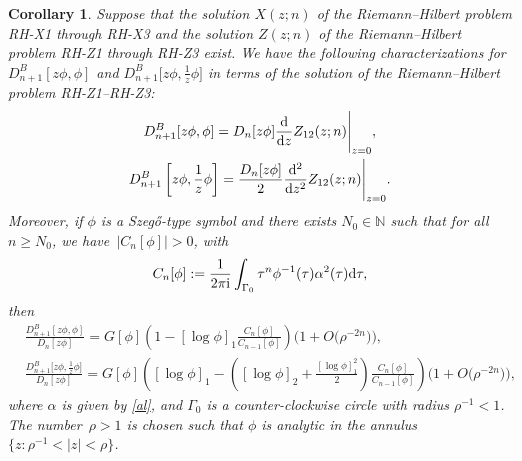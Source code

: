 \documentclass[pdftex]{sigma}
\numberwithin{equation}{section}
\newtheorem{Corollary}[Theorem]{Corollary}
\newcommand{\N}{{\mathbb N}}
\newcommand{\al}{\alpha}
\newcommand{\Ga}{\Gamma}
\newcommand{\ii}{{\rm i}}
\newcommand{\dd}{{\rm d}}
\begin{document}
		\begin{Corollary}\label{Cor zphi phi and phi/z}
			Suppose that the solution $X(z;n)$ of the Riemann--Hilbert problem {\rm RH-X1} through {\rm RH-X3} and the solution $Z(z;n)$ of the Riemann--Hilbert problem {\rm RH-Z1} through {\rm RH-Z3} exist. We have the following characterizations for $D^B_{n+1}[z\phi,\phi]$ and $D^B_{n+1}\big[z\phi,\frac{1}{z}\phi\big]$ in terms of the solution of the Riemann--Hilbert problem {\rm RH-Z1}--{\rm RH-Z3}:
			\begin{gather*}
				D^B_{n+1}[z\phi,\phi] = D_n[z\phi] \frac{\dd}{\dd z}Z_{12}(z;n) \Bigg|_{z=0}, \\
				D^B_{n+1}\left[z\phi,\frac{1}{z}\phi\right] = \frac{D_n[z\phi]}{2} \frac{\dd^2}{\dd z^2}Z_{12}(z;n) \Bigg|_{z=0}.
			\end{gather*}
			Moreover, if $\phi$ is a Szeg\H{o}-type symbol and there exists $N_0 \in \N$ such that for all $n \geq N_0$, we have~${|C_n[\phi]|>0}$, with
			\begin{equation}\label{Cnphi}
				C_n[\phi] := \frac{1}{2 \pi \ii} \int_{\Ga_0} \tau^n \phi^{-1}(\tau) \al^2(\tau) \dd \tau,
			\end{equation}
			then
			\begin{align}
				&\frac{D^B_{n+1}[z\phi,\phi]}{D_n[z\phi]}	 = G[\phi] \left( 1 - [\log \phi]_1 \frac{C_n[\phi]}{C_{n-1}[\phi]} \right) \big(1 + O\big(\rho^{-2n}\big)\big), \label{asymp zphi phi} \\	
&	\frac{D^B_{n+1}\big[z\phi,\frac{1}{z}\phi\big]}{D_n[z\phi]}	 = G[\phi] \left( [\log \phi]_1 - \left( [\log \phi]_2 +\frac{[\log \phi]^2_1}{2}\right) \frac{C_n[\phi]}{C_{n-1}[\phi]} \right) \big(1 + O\big(\rho^{-2n}\big)\big), \label{asymp zphi phi/z}
			\end{align}
			where $\al$ is given by \eqref{al}, and $\Ga_0$ is a counter-clockwise circle with radius $\rho^{-1}<1$. The number~${\rho>1}$ is chosen such that $\phi$ is analytic in the annulus $\{z\colon \rho^{-1}<|z|<\rho\}$.
		\end{Corollary}
\end{document}
